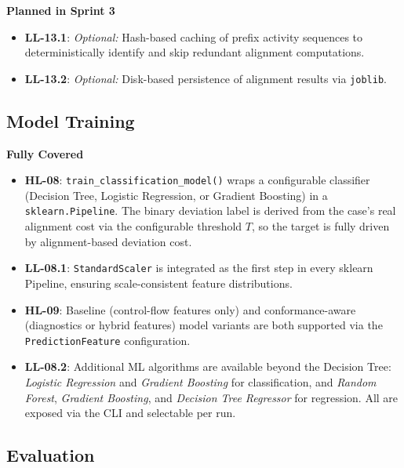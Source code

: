 \documentclass[12pt,a4paper]{article}
\newcommand{\newcov}[1]{\colorbox{green!40}{\textbf{#1}}}
\begin{document}
\textbf{Planned in Sprint 3}
\begin{itemize}
    \item \textbf{LL-13.1}: \textit{Optional:} \noindent Hash-based caching of prefix activity sequences to deterministically identify and skip redundant alignment computations.
    \item \textbf{LL-13.2}: \textit{Optional:} \noindent Disk-based persistence of alignment results via \texttt{joblib}.
\end{itemize}

\subsection{Model Training}
\textbf{Fully Covered}
\begin{itemize}
    \item \textbf{HL-08}: \texttt{train\_classification\_model()} wraps a configurable classifier (Decision Tree, Logistic Regression, or Gradient Boosting) in a \texttt{sklearn.Pipeline}. The binary deviation label is derived from the case's real alignment cost via the configurable threshold $T$, so the target is fully driven by alignment-based deviation cost.
    \item \textbf{LL-08.1}: \texttt{StandardScaler} is integrated as the first step in every sklearn Pipeline, ensuring scale-consistent feature distributions.
    \item \textbf{HL-09}: Baseline (control-flow features only) and conformance-aware (diagnostics or hybrid features) model variants are both supported via the \texttt{PredictionFeature} configuration.
    \item \newcov{LL-08.2}: Additional ML algorithms are available beyond the Decision Tree: \textit{Logistic Regression} and \textit{Gradient Boosting} for classification, and \textit{Random Forest}, \textit{Gradient Boosting}, and \textit{Decision Tree Regressor} for regression. All are exposed via the CLI and selectable per run.
\end{itemize}

\subsection{Evaluation}
\end{document}
